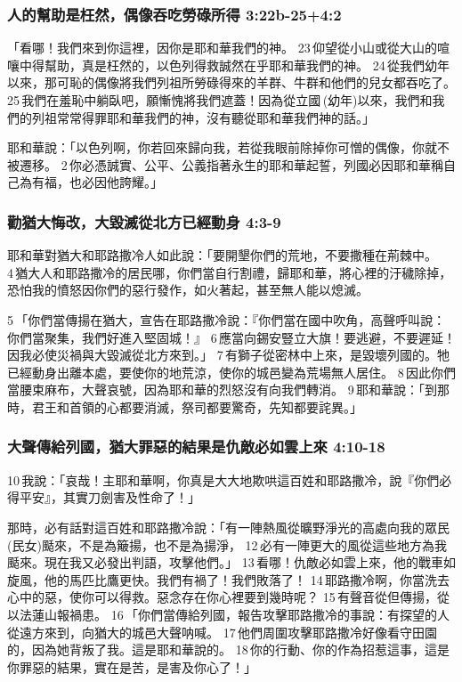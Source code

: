 \subsubsection{人的幫助是枉然，偶像吞吃勞碌所得 3:22b-25+4:2}
「看哪！我們來到你這裡，因你是耶和華我們的神。 23 仰望從小山或從大山的喧嚷中得幫助，真是枉然的，以色列得救誠然在乎耶和華我們的神。 24 從我們幼年以來，那可恥的偶像將我們列祖所勞碌得來的羊群、牛群和他們的兒女都吞吃了。 25 我們在羞恥中躺臥吧，願慚愧將我們遮蓋！因為從立國 (幼年)以來，我們和我們的列祖常常得罪耶和華我們的神，沒有聽從耶和華我們神的話。」

耶和華說：「以色列啊，你若回來歸向我，若從我眼前除掉你可憎的偶像，你就不被遷移。 2 你必憑誠實、公平、公義指著永生的耶和華起誓，列國必因耶和華稱自己為有福，也必因他誇耀。」

\subsubsection{勸猶大悔改，大毀滅從北方已經動身 4:3-9}
耶和華對猶大和耶路撒冷人如此說：「要開墾你們的荒地，不要撒種在荊棘中。 4 猶大人和耶路撒冷的居民哪，你們當自行割禮，歸耶和華，將心裡的汙穢除掉，恐怕我的憤怒因你們的惡行發作，如火著起，甚至無人能以熄滅。

5 「你們當傳揚在猶大，宣告在耶路撒冷說：『你們當在國中吹角，高聲呼叫說：你們當聚集，我們好進入堅固城！』 6 應當向錫安豎立大旗！要逃避，不要遲延！因我必使災禍與大毀滅從北方來到。」 7 有獅子從密林中上來，是毀壞列國的。牠已經動身出離本處，要使你的地荒涼，使你的城邑變為荒場無人居住。 8 因此你們當腰束麻布，大聲哀號，因為耶和華的烈怒沒有向我們轉消。 9 耶和華說：「到那時，君王和首領的心都要消滅，祭司都要驚奇，先知都要詫異。」

\subsubsection{大聲傳給列國，猶大罪惡的結果是仇敵必如雲上來 4:10-18}
10 我說：「哀哉！主耶和華啊，你真是大大地欺哄這百姓和耶路撒冷，說『你們必得平安』，其實刀劍害及性命了！」

那時，必有話對這百姓和耶路撒冷說：「有一陣熱風從曠野淨光的高處向我的眾民(民女)颳來，不是為簸揚，也不是為揚淨， 12 必有一陣更大的風從這些地方為我颳來。現在我又必發出判語，攻擊他們。」 13 看哪！仇敵必如雲上來，他的戰車如旋風，他的馬匹比鷹更快。我們有禍了！我們敗落了！ 14 耶路撒冷啊，你當洗去心中的惡，使你可以得救。惡念存在你心裡要到幾時呢？ 15 有聲音從但傳揚，從以法蓮山報禍患。 16 「你們當傳給列國，報告攻擊耶路撒冷的事說：有探望的人從遠方來到，向猶大的城邑大聲呐喊。 17 他們周圍攻擊耶路撒冷好像看守田園的，因為她背叛了我。這是耶和華說的。 18 你的行動、你的作為招惹這事，這是你罪惡的結果，實在是苦，是害及你心了！」

